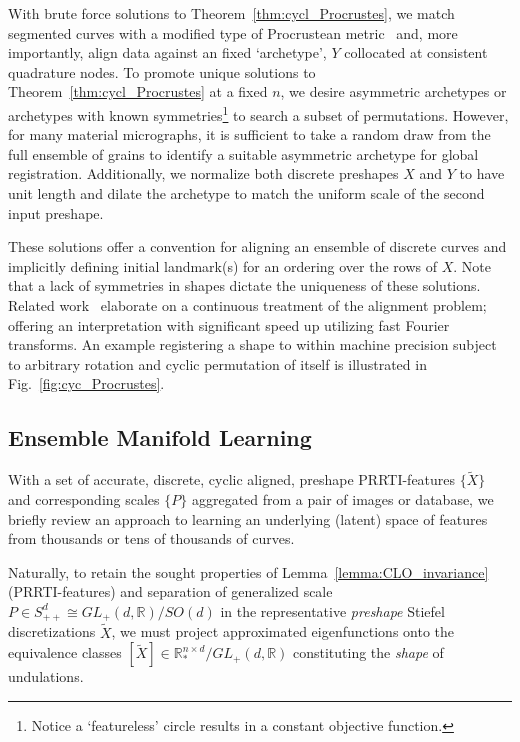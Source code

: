 \documentclass[pdflatex,iicol]{sn-jnl}%
\theoremstyle{thmstyleone}%
\theoremstyle{thmstyletwo}%
\theoremstyle{thmstylethree}%
\begin{document}
With brute force solutions to Theorem~\ref{thm:cycl_Procrustes}, we match segmented curves with a modified type of Procrustean metric~\cite{srivastava2016functional} and, more importantly, align data against an fixed `archetype', $Y$ collocated at consistent quadrature nodes. To promote unique solutions to Theorem~\ref{thm:cycl_Procrustes} at a fixed $n$, we desire asymmetric archetypes or archetypes with known symmetries\footnote{Notice a `featureless' circle results in a constant objective function.} to search a subset of permutations. However, for many material micrographs, it is sufficient to take a random draw from the full ensemble of grains to identify a suitable asymmetric archetype for global registration. Additionally, we normalize both discrete preshapes $X$ and $Y$ to have unit length and dilate the archetype to match the uniform scale of the second input preshape.

These solutions offer a convention for aligning an ensemble of discrete curves and implicitly defining initial landmark(s) for an ordering over the rows of $X$. Note that a lack of symmetries in shapes dictate the uniqueness of these solutions. Related work~\cite{dogan2015fast} elaborate on a continuous treatment of the alignment problem; offering an interpretation with significant speed up utilizing fast Fourier transforms. An example registering a shape to within machine precision subject to arbitrary rotation and cyclic permutation of itself is illustrated in Fig.~\ref{fig:cyc_Procrustes}.


\subsection{Ensemble Manifold Learning} \label{subsec:mfld_learn}
With a set of accurate, discrete, cyclic aligned, preshape PRRTI-features $\lbrace \widetilde{X} \rbrace$ and corresponding scales $\lbrace P\rbrace$ aggregated from a pair of images or database, we briefly review an approach to learning an underlying (latent) space of features from thousands or tens of thousands of curves.

Naturally, to retain the sought properties of Lemma~\ref{lemma:CLO_invariance} (PRRTI-features) and separation of generalized scale $P \in S^d_{++} \cong GL_+(d, \mathbb{R})/SO(d)$ in the representative \textit{preshape} Stiefel discretizations $\widetilde{X}$, we must project approximated eigenfunctions onto the equivalence classes $[\widetilde{X}] \in \mathbb{R}^{n \times d}_*/GL_+(d, \mathbb{R})$ constituting the \textit{shape} of undulations. 
\end{document}
